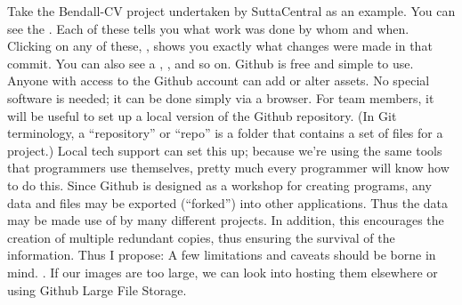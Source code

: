 {}Take the Bendall-CV project undertaken by SuttaCentral as an example. You can see the . Each of these tells you what work was done by whom and when. Clicking on any of these, , shows you exactly what changes were made in that commit. You can also see a , , and so on.\markdownRendererInterblockSeparator
{}Github is free and simple to use. Anyone with access to the Github account can add or alter assets. No special software is needed; it can be done simply via a browser. For team members, it will be useful to set up a local version of the Github repository. (In Git terminology, a “repository” or “repo” is a folder that contains a set of files for a project.) Local tech support can set this up; because we’re using the same tools that programmers use themselves, pretty much every programmer will know how to do this.\markdownRendererInterblockSeparator
{}Since Github is designed as a workshop for creating programs, any data and files may be exported (“forked”) into other applications. Thus the data may be made use of by many different projects. In addition, this encourages the creation of multiple redundant copies, thus ensuring the survival of the information.\markdownRendererInterblockSeparator
{}Thus I propose:\markdownRendererInterblockSeparator
{}\markdownRendererBlockQuoteBegin
{}
\markdownRendererBlockQuoteEnd \markdownRendererInterblockSeparator
{}\markdownRendererInterblockSeparator
{}A few limitations and caveats should be borne in mind.\markdownRendererInterblockSeparator
{}\markdownRendererUlBegin
\markdownRendererUlItem {}. If our images are too large, we can look into hosting them elsewhere or using Github Large File Storage.\markdownRendererUlItemEnd 
